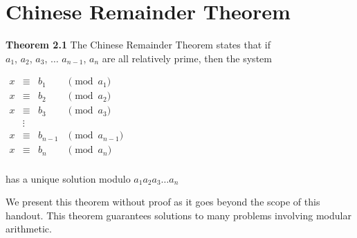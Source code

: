 \documentclass{article}
\begin{document}
\section{Chinese Remainder Theorem}
\begin{mdframed}
    \textbf{Theorem 2.1} The Chinese Remainder Theorem states that if \\$a_1$, $a_2$, $a_3$, $\dots$ $a_{n-1}$, $a_n$ are all relatively prime, then the system
    \begin{center}
        $\begin{array}{rcll}
             x &\equiv &b_1 &\pmod{a_1}\\
             x &\equiv &b_2 &\pmod{a_2}\\
             x &\equiv &b_3 &\pmod{a_3}\\
               &\vdots & &\\
            x &\equiv &b_{n-1} &\pmod{a_{n-1}}\\

             x &\equiv &b_n &\pmod{a_n}\\
        \end{array}$
    \end{center}
    has a unique solution modulo $a_1 a_2 a_3 \dots a_n$
\end{mdframed}
We present this theorem without proof as it goes beyond the scope of this handout.
This theorem guarantees solutions to many problems involving modular arithmetic.
\end{document}
